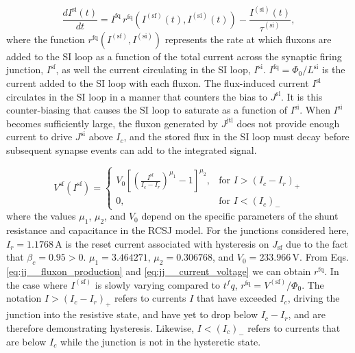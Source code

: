 \documentclass[twocolumn]{article}
\begin{document}
\begin{equation}
\label{eq:synapses__leaky_integrator}
\frac{dI^{\mathrm{si}}(t)}{dt} = I^{\mathrm{fq}}\,r^{\mathrm{fq}}\left(I^{(\mathrm{sf})}(t),I^{(\mathrm{si})}(t)\right) -\frac{I^{(\mathrm{si})}(t)}{\tau^{(\mathrm{si})}},
\end{equation}
where the function $r^{\mathrm{fq}}\left(I^{(\mathrm{sf})},I^{(\mathrm{si})}\right)$ represents the rate at which fluxons are added to the SI loop as a function of the total current across the synaptic firing junction, $I^{\mathrm{sf}}$, as well the current circulating in the SI loop, $I^{\mathrm{si}}$. $I^{\mathrm{fq}} = \Phi_0/L^{\mathrm{si}}$ is the current added to the SI loop with each fluxon. The flux-induced current $I^{\mathrm{si}}$ circulates in the SI loop in a manner that counters the bias to $J^{\mathrm{si}}$. It is this counter-biasing that causes the SI loop to saturate as a function of $I^{\mathrm{si}}$. When $I^{\mathrm{si}}$ becomes sufficiently large, the fluxon generated by $J^{\mathrm{jtl}}$ does not provide enough current to drive $J^{\mathrm{si}}$ above $I_c$, and the stored flux in the SI loop must decay before subsequent synapse events can add to the integrated signal.

\begin{equation}
\label{eq:jj__current_voltage}
V^{\mathrm{sf}}(I^{\mathrm{sf}}) = \begin{cases} V_0\left[ \left( \frac{I^{\mathrm{sf}}}{I_c-I_r} \right)^{\mu_1} - 1 \right]^{\mu_2}, & \text{for } I > (I_c-I_r)_+ \\
0, & \text{for } I < (I_c)_-
\end{cases}
\end{equation} 
where the values $\mu_1$, $\mu_2$, and $V_0$ depend on the specific parameters of the shunt resistance and capacitance in the RCSJ model. For the junctions considered here, $I_r = 1.1768$\,\textmu A is the reset current associated with hysteresis on $J_{\mathrm{sf}}$ due to the fact that $\beta_c = 0.95 > 0$. $\mu_1 = 3.464271$, $\mu_2 = 0.306768$, and $V_0 = 233.966$\,\textmu V. From Eqs.\,\ref{eq:jj__fluxon_production} and \ref{eq:jj__current_voltage} we can obtain $r^{\mathrm{fq}}$. In the case where $I^{(\mathrm{sf})}$ is slowly varying compared to $t^fq$, $ r^{\mathrm{fq}} = V^{(\mathrm{sf})}/\Phi_0$. The notation $I > (I_c-I_r)_+$ refers to currents $I$ that have exceeded $I_c$, driving the junction into the resistive state, and have yet to drop below $I_c-I_r$, and are therefore demonstrating hysteresis. Likewise, $I<(I_c)_-$ refers to currents that are below $I_c$ while the junction is not in the hysteretic state.
\end{document}
